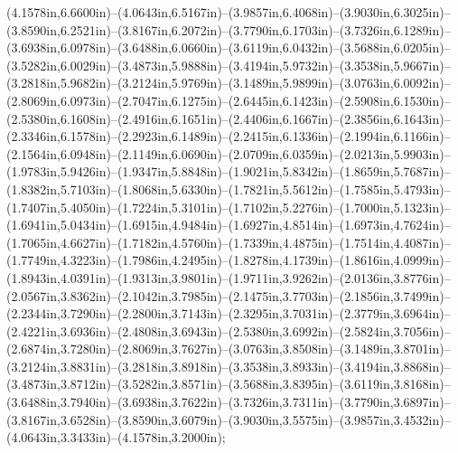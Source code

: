 (4.1578in,6.6600in)--(4.0643in,6.5167in)--(3.9857in,6.4068in)--(3.9030in,6.3025in)--(3.8590in,6.2521in)--(3.8167in,6.2072in)--(3.7790in,6.1703in)--(3.7326in,6.1289in)--(3.6938in,6.0978in)--(3.6488in,6.0660in)--(3.6119in,6.0432in)--(3.5688in,6.0205in)--(3.5282in,6.0029in)--(3.4873in,5.9888in)--(3.4194in,5.9732in)--(3.3538in,5.9667in)--(3.2818in,5.9682in)--(3.2124in,5.9769in)--(3.1489in,5.9899in)--(3.0763in,6.0092in)--(2.8069in,6.0973in)--(2.7047in,6.1275in)--(2.6445in,6.1423in)--(2.5908in,6.1530in)--(2.5380in,6.1608in)--(2.4916in,6.1651in)--(2.4406in,6.1667in)--(2.3856in,6.1643in)--(2.3346in,6.1578in)--(2.2923in,6.1489in)--(2.2415in,6.1336in)--(2.1994in,6.1166in)--(2.1564in,6.0948in)--(2.1149in,6.0690in)--(2.0709in,6.0359in)--(2.0213in,5.9903in)--(1.9783in,5.9426in)--(1.9347in,5.8848in)--(1.9021in,5.8342in)--(1.8659in,5.7687in)--(1.8382in,5.7103in)--(1.8068in,5.6330in)--(1.7821in,5.5612in)--(1.7585in,5.4793in)--(1.7407in,5.4050in)--(1.7224in,5.3101in)--(1.7102in,5.2276in)--(1.7000in,5.1323in)--(1.6941in,5.0434in)--(1.6915in,4.9484in)--(1.6927in,4.8514in)--(1.6973in,4.7624in)--(1.7065in,4.6627in)--(1.7182in,4.5760in)--(1.7339in,4.4875in)--(1.7514in,4.4087in)--(1.7749in,4.3223in)--(1.7986in,4.2495in)--(1.8278in,4.1739in)--(1.8616in,4.0999in)--(1.8943in,4.0391in)--(1.9313in,3.9801in)--(1.9711in,3.9262in)--(2.0136in,3.8776in)--(2.0567in,3.8362in)--(2.1042in,3.7985in)--(2.1475in,3.7703in)--(2.1856in,3.7499in)--(2.2344in,3.7290in)--(2.2800in,3.7143in)--(2.3295in,3.7031in)--(2.3779in,3.6964in)--(2.4221in,3.6936in)--(2.4808in,3.6943in)--(2.5380in,3.6992in)--(2.5824in,3.7056in)--(2.6874in,3.7280in)--(2.8069in,3.7627in)--(3.0763in,3.8508in)--(3.1489in,3.8701in)--(3.2124in,3.8831in)--(3.2818in,3.8918in)--(3.3538in,3.8933in)--(3.4194in,3.8868in)--(3.4873in,3.8712in)--(3.5282in,3.8571in)--(3.5688in,3.8395in)--(3.6119in,3.8168in)--(3.6488in,3.7940in)--(3.6938in,3.7622in)--(3.7326in,3.7311in)--(3.7790in,3.6897in)--(3.8167in,3.6528in)--(3.8590in,3.6079in)--(3.9030in,3.5575in)--(3.9857in,3.4532in)--(4.0643in,3.3433in)--(4.1578in,3.2000in);

